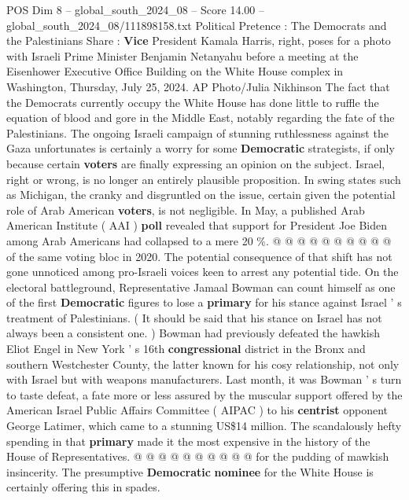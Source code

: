 \begin{textsample}{POS Dim 8 – global\_south\_2024\_08 – Score 14.00 – global\_south\_2024\_08/111898158.txt}  \label{ex:f8_pos_172}
Political Pretence : The Democrats and the Palestinians Share : \textbf{Vice} President Kamala Harris, right, poses for a photo with Israeli Prime Minister Benjamin Netanyahu before a meeting at the Eisenhower Executive Office Building on the White House complex in Washington, Thursday, July 25, 2024.
AP Photo/Julia Nikhinson The fact that the Democrats currently occupy the White House has done little to ruffle the equation of blood and gore in the Middle East, notably regarding the fate of the Palestinians.
The ongoing Israeli campaign of stunning ruthlessness against the Gaza unfortunates is certainly a worry for some \textbf{Democratic} strategists, if only because certain \textbf{voters} are finally expressing an opinion on the subject.
Israel, right or wrong, is no longer an entirely plausible proposition.
In swing states such as Michigan, the cranky and disgruntled on the issue, certain given the potential role of Arab American \textbf{voters}, is not negligible.
In May, a published Arab American Institute ( AAI ) \textbf{poll} revealed that support for President Joe Biden among Arab Americans had collapsed to a mere 20 \%. @ @ @ @ @ @ @ @ @ @ of the same voting bloc in 2020.
The potential consequence of that shift has not gone unnoticed among pro-Israeli voices keen to arrest any potential tide.
On the electoral battleground, Representative Jamaal Bowman can count himself as one of the first \textbf{Democratic} figures to lose a \textbf{primary} for his stance against Israel ' s treatment of Palestinians. ( It should be said that his stance on Israel has not always been a consistent one. ) Bowman had previously defeated the hawkish Eliot Engel in New York ' s 16th \textbf{congressional} district in the Bronx and southern Westchester County, the latter known for his cosy relationship, not only with Israel but with weapons manufacturers.
Last month, it was Bowman ' s turn to taste defeat, a fate more or less assured by the muscular support offered by the American Israel Public Affairs Committee ( AIPAC ) to his \textbf{centrist} opponent George Latimer, which came to a stunning US\$14 million.
The scandalously hefty spending in that \textbf{primary} made it the most expensive in the history of the House of Representatives. @ @ @ @ @ @ @ @ @ @ for the pudding of mawkish insincerity.
The presumptive \textbf{Democratic} \textbf{nominee} for the White House is certainly offering this in spades.

\end{textsample}
